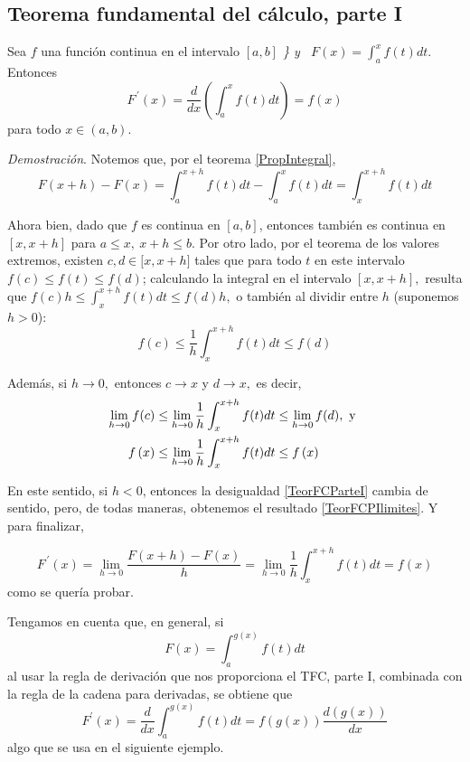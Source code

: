 \subsection*{Teorema fundamental del cálculo, parte I}

\textnormal{Sea \textit{$f$} una función continua en el intervalo \textit{$\left[ a,b\right] $ \} y \textit{\ $F(x)=\displaystyle{\int_{a}^{x}f(t)dt}.$}} Entonces
\[
F^{\, \prime}(x)=\frac{d}{dx}\left(\int_{a}^{x}f(t)dt\right)=f(x)
\]
 para todo $x\in \left( a,b\right) .$}

\textit{Demostración}. Notemos que, por el teorema \ref{PropIntegral},
\[
F(x+h)-F(x)=\int_{a}^{x+h}f(t)dt-\int_{a}^{x}f(t)dt=\int_{x}^{x+h}f(t)dt
\]

Ahora bien, dado que $f$ es continua en $\left[ a,b\right]$, entonces también es continua en $\left[ x,x+h\right]$ para $a\leq x,\ x+h\leq b$. Por otro lado, por el teorema de los valores extremos\textcite{Zill_Wright_2011}, existen $c,d\in \lbrack x,x+h]$ tales que para todo $t$ en este intervalo $f\left( c\right) \leq
f(t)\leq f(d)$; calculando la integral en el intervalo $[x,x+h],$ resulta que $f(c)h\leq \int_{x}^{x+h}f(t)dt\leq f(d)h,$ o también al dividir entre $h$ (suponemos $h>0$):
\begin{equation}\label{TeorFCParteI}
f(c)\leq \frac{1}{h}\int_{x}^{x+h}f(t)dt\leq f(d)
\end{equation}

Además, si $h\rightarrow 0,$ entonces $c\to x$ y $d\to x,$ es decir,
\begin{align}\label{TeorFCPIlimites}
\lim_{h\rightarrow 0}f(c)&\leq \lim_{h\rightarrow 0}\frac{1}{h}
\int_{x}^{x+h}f(t)dt\leq \lim_{h\rightarrow 0}f(d), \text{ y } \notag\\
f\left( x\right) &\leq \lim_{h\rightarrow 0}\frac{1}{h}\int_{x}^{x+h}f(t)dt%
\leq f\left( x\right)
\end{align}

En este sentido, si $h<0$, entonces la desigualdad \eqref{TeorFCParteI} cambia de sentido, pero, de todas maneras, obtenemos el resultado \eqref{TeorFCPIlimites}.
\clearpage
Y para finalizar,

\[
F^{\, \prime}(x)=\lim_{h\rightarrow 0}\frac{ F(x+h)-F(x)}{h}=\lim_{h\rightarrow 0}\frac{1}{h}\int_{x}^{x+h}f(t)dt=f(x)
\]
como se quería probar. 

Tengamos en cuenta que, en general, si
\[
F(x)=\int_{a}^{g(x)}f(t)dt
\]
al usar la regla de derivación que nos proporciona el TFC, parte I, combinada con la regla de la cadena
para derivadas, se obtiene que
\[
F^{\prime}(x)=\frac{d}{dx}\int_{a}^{g(x)}f(t)dt=f(g(x))\frac{d(g(x))}{dx}
\]
algo que se usa en el siguiente ejemplo.

